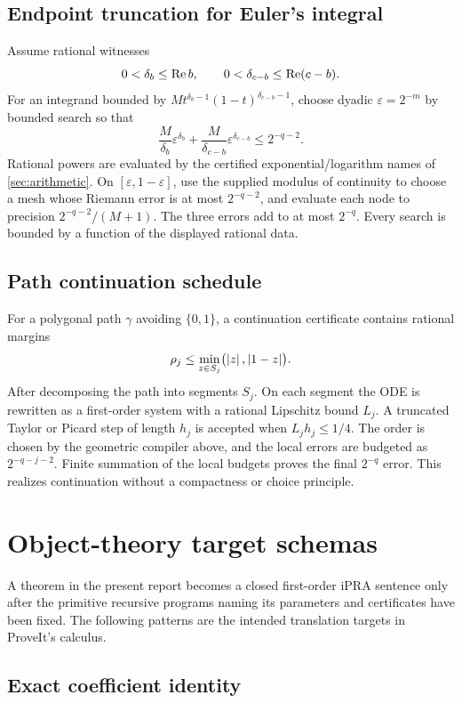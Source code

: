 \subsection{Endpoint truncation for Euler's integral}

Assume rational witnesses
\[
 0<\delta_b\le\operatorname{Re} b,
 \qquad
 0<\delta_{c-b}\le\operatorname{Re}(c-b).
\]
For an integrand bounded by
\(M t^{\delta_b-1}(1-t)^{\delta_{c-b}-1}\), choose dyadic
\(\varepsilon=2^{-m}\) by bounded search so that
\[
 \frac{M}{\delta_b}\varepsilon^{\delta_b}
 +\frac{M}{\delta_{c-b}}\varepsilon^{\delta_{c-b}}
 \le 2^{-q-2}.
\]
Rational powers are evaluated by the certified exponential/logarithm names of
\cref{sec:arithmetic}.  On \([\varepsilon,1-\varepsilon]\), use the supplied
modulus of continuity to choose a mesh whose Riemann error is at most
\(2^{-q-2}\), and evaluate each node to precision \(2^{-q-2}/(M+1)\).  The
three errors add to at most \(2^{-q}\).  Every search is bounded by a function
of the displayed rational data.

\subsection{Path continuation schedule}

For a polygonal path \(\gamma\) avoiding \(\{0,1\}\), a continuation
certificate contains rational margins
\[
 \rho_j\le \min_{z\in S_j}\bigl(\left|z\right|,\left|1-z\right|\bigr).
\]
After decomposing the path into segments \(S_j\).  On each segment the ODE is
rewritten as a first-order system with a rational Lipschitz bound \(L_j\).
A truncated Taylor or Picard step of length \(h_j\) is accepted when
\(L_jh_j\le 1/4\).  The order is chosen by the geometric compiler above,
and the local errors are budgeted as
\(2^{-q-j-2}\).  Finite summation of the local budgets proves the final
\(2^{-q}\) error.  This realizes continuation without a compactness or
choice principle.

\section{Object-theory target schemas}\label{app:targets}

A theorem in the present report becomes a closed first-order iPRA sentence
only after the primitive recursive programs naming its parameters and
certificates have been fixed.  The following patterns are the intended
translation targets in ProveIt's  calculus.

\subsection{Exact coefficient identity}

